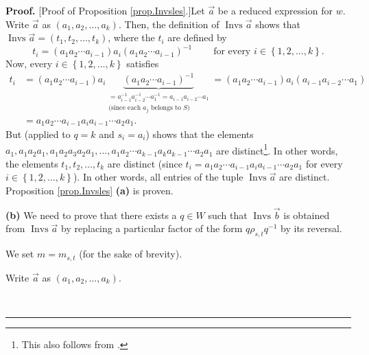 \documentclass[numbers=enddot,12pt,final,onecolumn,notitlepage,abstracton]{scrartcl}%
\theoremstyle{definition}
\newenvironment{proof}[1][Proof]{\noindent\textbf{#1.} }{\ \rule{0.5em}{0.5em}}
\begin{document}
\begin{proof}
[Proof of Proposition \ref{prop.Invsles}.]Let $\overrightarrow{a}$ be a
reduced expression for $w$. Write $\overrightarrow{a}$ as $\left(  a_{1}%
,a_{2},\ldots,a_{k}\right)  $. Then, the definition of $\operatorname*{Invs}%
\overrightarrow{a}$ shows that $\operatorname*{Invs}\overrightarrow{a}=\left(
t_{1},t_{2},\ldots,t_{k}\right)  $, where the $t_{i}$ are defined by%
\[
t_{i}=\left(  a_{1}a_{2}\cdots a_{i-1}\right)  a_{i}\left(  a_{1}a_{2}\cdots
a_{i-1}\right)  ^{-1}\ \ \ \ \ \ \ \ \ \ \text{for every }i\in\left\{
1,2,\ldots,k\right\}  .
\]
Now, every $i\in\left\{  1,2,\ldots,k\right\}  $ satisfies%
\begin{align*}
t_{i}  &  =\left(  a_{1}a_{2}\cdots a_{i-1}\right)  a_{i}\underbrace{\left(
a_{1}a_{2}\cdots a_{i-1}\right)  ^{-1}}_{\substack{=a_{i-1}^{-1}a_{i-2}%
^{-1}\cdots a_{1}^{-1}=a_{i-1}a_{i-2}\cdots a_{1}\\\text{(since each }%
a_{j}\text{ belongs to }S\text{)}}}=\left(  a_{1}a_{2}\cdots a_{i-1}\right)
a_{i}\left(  a_{i-1}a_{i-2}\cdots a_{1}\right) \\
&  =a_{1}a_{2}\cdots a_{i-1}a_{i}a_{i-1}\cdots a_{2}a_{1}.
\end{align*}
But \cite[Proposition 1.6 (a)]{Lusztig-Hecke} (applied to $q=k$ and
$s_{i}=a_{i}$) shows that the elements $a_{1},a_{1}a_{2}a_{1},a_{1}a_{2}%
a_{3}a_{2}a_{1},\ldots,a_{1}a_{2}\cdots a_{k-1}a_{k}a_{k-1}\cdots a_{2}a_{1}$
are distinct\footnote{This also follows from \cite[Chapter 4, n$^{\circ}$ 1.4,
Lemme 2]{Bourbaki4-6}.}. In other words, the elements $t_{1},t_{2}%
,\ldots,t_{k}$ are distinct (since \newline$t_{i}=a_{1}a_{2}\cdots
a_{i-1}a_{i}a_{i-1}\cdots a_{2}a_{1}$ for every $i\in\left\{  1,2,\ldots
,k\right\}  $). In other words, all entries of the tuple $\operatorname*{Invs}%
\overrightarrow{a}$ are distinct. Proposition \ref{prop.Invsles} \textbf{(a)}
is proven. \medskip

\textbf{(b)} We need to prove that there exists a $q\in W$ such that
$\operatorname*{Invs}\overrightarrow{b}$ is obtained from
$\operatorname*{Invs}\overrightarrow{a}$ by replacing a particular factor of
the form $q\rho_{s,t}q^{-1}$ by its reversal.

We set $m=m_{s,t}$ (for the sake of brevity).

Write $\overrightarrow{a}$ as $\left(  a_{1},a_{2},\ldots,a_{k}\right)  $.


\end{proof}
\end{document}
